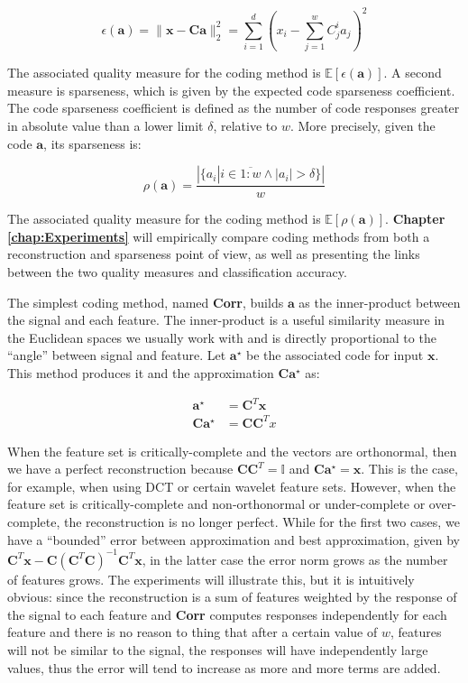 \documentclass[12pt,a4paper,oneside,english]{UPBThesis}
\newcommand{\hcrange}[2]{\overline{{#1}\colon\!\!{#2}}}
\begin{document}
\begin{equation*}
\epsilon(\textbf{a}) = \| \textbf{x} - \textbf{C}\textbf{a} \|_2^2 = \sum_{i=1}^d {( x_i - \sum_{j=1}^w {C_j^i a_j})^2}
\end{equation*}

The associated quality measure for the coding method is $\mathbb{E} [ \epsilon(\textbf{a}) ]$. A second measure is sparseness, which is given by the expected code sparseness coefficient. The code sparseness coefficient is defined as the number of code responses greater in absolute value than a lower limit $\delta$, relative to $w$. More precisely, given the code $\textbf{a}$, its sparseness is:

\begin{equation*}
\rho(\textbf{a}) = \frac{\left| \{ a_i \left|\right. i \in \hcrange{1}{w} \wedge \left|a_i\right| > \delta \} \right|}{w}
\end{equation*}

The associated quality measure for the coding method is $\mathbb{E} [ \rho(\textbf{a}) ]$. \textbf{Chapter \ref{chap:Experiments}} will empirically compare coding methods from both a reconstruction and sparseness point of view, as well as presenting the links between the two quality measures and classification accuracy.

The simplest coding method, named \textbf{Corr}, builds $\textbf{a}$ as the inner-product between the signal and each feature. The inner-product is a useful similarity measure in the Euclidean spaces we usually work with and is directly proportional to the ``angle'' between signal and feature. Let $\textbf{a}^\star$ be the associated code for input $\textbf{x}$. This method produces it and the approximation $\textbf{C}\textbf{a}^\star$ as:

\begin{align*}
\textbf{a}^\star & = \textbf{C}^T\textbf{x} \\
\textbf{C}\textbf{a}^\star & = \textbf{C}\textbf{C}^Tx
\end{align*}

When the feature set is critically-complete and the vectors are orthonormal, then we have a perfect reconstruction because $\textbf{C}\textbf{C}^T = \mathbb{I}$ and $\textbf{C}\textbf{a}^\star = \textbf{x}$. This is the case, for example, when using DCT or certain wavelet feature sets. However, when the feature set is critically-complete and non-orthonormal or under-complete or over-complete, the reconstruction is no longer perfect. While for the first two cases, we have a ``bounded'' error between approximation and best approximation, given by $\textbf{C}^T\textbf{x} - \textbf{C}(\textbf{C}^T\textbf{C})^{-1}\textbf{C}^T\textbf{x}$, in the latter case the error norm grows as the number of features grows. The experiments will illustrate this, but it is intuitively obvious: since the reconstruction is a sum of features weighted by the response of the signal to each feature and \textbf{Corr} computes responses independently for each feature and there is no reason to thing that after a certain value of $w$, features will not be similar to the signal, the responses will have independently large values, thus the error will tend to increase as more and more terms are added.
\end{document}
